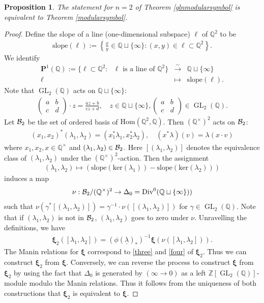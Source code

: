 \documentclass[12pt,amstex,amssymb]{article}
\theoremstyle{plain}
\newtheorem{proposition}[theorem]{Proposition}
\theoremstyle{definition}
\def\g{\gamma}
\def\cB{{\cal B}}
\def\Z{{\mathbb Z}}
\def\Q{{\mathbb Q}}
\def\Hom{\text{Hom}}
\def\ker{\text{ker}}
\def\ulambda {{\underline{\lambda}}}
\def\BP{{\mathbf{P}}}
\def\g{\gamma}
\newcommand{\be}{\begin{eqnarray*}}
\newcommand{\ee}{\end{eqnarray*}}
\newcommand{\bea}{\begin{eqnarray}}
\newcommand{\eea}{\end{eqnarray}}
\newcommand{\GL}{\operatorname{GL}}
\begin{document}
\begin{proposition}\label{cgcom}
The statement for $n=2$ of Theorem \ref{glnmodularsymbol} is equivalent to Theorem \ref{modularsymbol}.
\end{proposition}
\begin{proof}
Define the slope of a line (one-dimensional subspace) $\ell$ of $\Q^2$ to be
\be
\mathrm{slope}(\ell):=\left\{\frac{x}{y}\in \Q \sqcup \{\infty\} : (x,y) \in \ell \subset \Q^2 \right\}.
\ee
We identify
\be
\BP^1(\Q):=\{ \ell \subset \Q^2 :  \text{ $\ell$ is a line of $\Q^2$} \}
 &\xrightarrow{\sim}&   \Q \sqcup \{\infty\}\\
\ell &\mapsto& \mathrm{slope}(\ell).
\ee
Note that $\GL_2(\Q)$ acts on $\Q \sqcup \{\infty\}$:
\be
\begin{pmatrix}
a & b\\
c& d
\end{pmatrix} 
\cdot z = \frac{az+b}{cz+d}, \quad z \in \Q \sqcup \{\infty\}, \begin{pmatrix}
a & b\\
c& d
\end{pmatrix}  \in \GL_2(\Q).
\ee
Let $\cB_2$ be the set of ordered basis of $\Hom(\Q^2,\Q)$.
Then $(\Q^\times)^2$ acts on $\cB_2$:
\be
(x_1,x_2)^*(\lambda_1,\lambda_2)= (x_1^*\lambda_1, x_2^*\lambda_2),
\quad (x^* \lambda)(v)=\lambda(x\cdot v)
\ee
where $x_1, x_2,x \in \Q^\times$ and $(\lambda_1,\lambda_2) \in \cB_2$.
Here $[(\lambda_1,\lambda_2)]$ denotes the equivalence class of $(\lambda_1,\lambda_2)$ under the $(\Q^\times)^2$-action.
Then the assignment
\bea \label{assingn}
(\lambda_1,\lambda_2) \mapsto (\mathrm{slope}(\ker(\lambda_1))-\mathrm{slope}(\ker(\lambda_2)))
\eea
induces a map 
$$
\nu: \cB_2/(\Q^\times)^2 \to \Delta_0=\mathrm{Div}^0(\Q\sqcup \{\infty\})) 
$$
such that  $\nu (\g^* [(\lambda_1, \lambda_2)]) = \g^{-1}\cdot \nu([(\lambda_1,\lambda_2)])$ for $\g \in \GL_2(\Q)$. Note that if $(\lambda_1, \lambda_2)$ is not in $\cB_2$, $(\lambda_1, \lambda_2)$ goes to zero under $\nu$.
Unravelling the definitions, we have
\bea \label{rln}
 \bm\xi_2([\lambda_1, \lambda_2]) = (\phi(\ulambda)_\ast)^{-1} \bm\xi(\nu([\lambda_1, \lambda_2])).
\eea
The Manin relations for $\bm\xi$ correspond to \eqref{three} and \eqref{four} of $\bm\xi_2$. Thus we can construct $\bm\xi_2$ from $\bm\xi$.
Conversely, we can reverse the process to construct $\bm\xi$ from $\bm\xi_2$ by using the fact that $\Delta_0$ is generated by $(\infty \to 0)$ as a left $\Z[\GL_2(\Q)]$-module modulo the Manin relations.
Thus it follows from the uniqueness of both constructions that $\bm\xi_2$ is equivalent to $\bm\xi$.
\end{proof}
\end{document}
